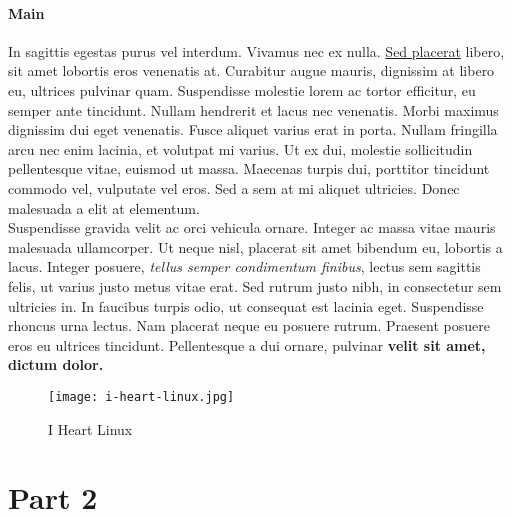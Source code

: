 \documentclass[12pt,a4paper]{article}
\begin{document}
	\subsection{Main}
	\label{Main}
	In sagittis egestas purus vel interdum. Vivamus nec ex nulla. \underline{Sed placerat}  libero, sit amet lobortis eros venenatis at. Curabitur augue mauris, dignissim at libero eu, ultrices pulvinar quam. Suspendisse molestie lorem ac tortor efficitur, eu semper ante tincidunt. Nullam hendrerit et lacus nec venenatis. Morbi maximus dignissim dui eget venenatis. Fusce aliquet varius erat in porta. Nullam fringilla arcu nec enim lacinia, et volutpat mi varius. Ut ex dui, molestie sollicitudin pellentesque vitae, euismod ut massa. Maecenas turpis dui, porttitor tincidunt commodo vel, vulputate vel eros. Sed a sem at mi aliquet ultricies. Donec malesuada a elit at elementum. \\Suspendisse gravida velit ac orci vehicula ornare. Integer ac massa vitae mauris malesuada ullamcorper. Ut neque nisl, placerat sit amet bibendum eu, lobortis a lacus. Integer posuere, \textit{tellus semper condimentum finibus}, lectus sem sagittis felis, ut varius justo metus vitae erat. Sed rutrum justo nibh, in consectetur sem ultricies in. In faucibus turpis odio, ut consequat est lacinia eget. Suspendisse rhoncus urna lectus. Nam placerat neque eu posuere rutrum. Praesent posuere eros eu ultrices tincidunt. Pellentesque a dui ornare, pulvinar  \textbf{velit sit amet, dictum dolor.}
	\begin{figure}[H]
		\centering
		\texttt{[image: i-heart-linux.jpg]}
		\caption{I Heart Linux}
		\label{fig: IHeartLInux}
	\end{figure}
	
	\part{Part 2}
\end{document}
